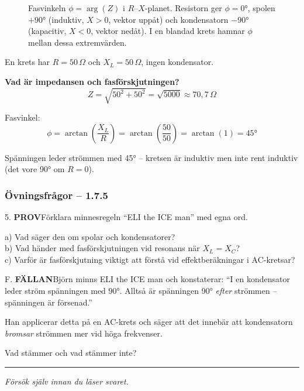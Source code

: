 \documentclass[a4paper,11pt,twoside]{book}
\newcommand{\qprov}{\colorbox{redpale}{\textcolor{reddark}{\headingfont\bfseries\tiny PROV}}}
\newcommand{\qfallan}{\colorbox{ljusbrun}{\textcolor{kakao}{\headingfont\bfseries\tiny FÄLLAN}}}
\begin{document}
\begin{figure}[htbp]
\begin{tikzpicture}[>=stealth, font=\small]
\end{tikzpicture}
\caption{Fasvinkeln $\phi = \arg(Z)$ i $R$--$X$-planet.
Resistorn ger $\phi=0°$, spolen $+90°$ (induktiv, $X>0$, vektor uppåt)
och kondensatorn $-90°$ (kapacitiv, $X<0$, vektor nedåt).
I en blandad krets hamnar $\phi$ mellan dessa extremvärden.}
\label{fig:fasordiagram}
\end{figure}

\begin{worked}[title={Räkneexempel 1.7.5 -- Fasförhållande i en blandad krets}]
En krets har $R = 50\,\Omega$ och $X_L = 50\,\Omega$,
ingen kondensator.

\textbf{Vad är impedansen och fasförskjutningen?}
\[ Z = \sqrt{50^2 + 50^2} = \sqrt{5000} \approx 70{,}7\,\Omega \]

Fasvinkel:
\[ \phi = \arctan\!\left(\frac{X_L}{R}\right) = \arctan\!\left(\frac{50}{50}\right) = \arctan(1) = 45° \]

Spänningen leder strömmen med 45° -- kretsen är
induktiv men inte rent induktiv (det vore 90° om
$R = 0$).
\end{worked}

\subsubsection*{Övningsfrågor -- 1.7.5}

\begin{qblock}{5.}
\qprov\quad Förklara minnesregeln ``ELI the ICE man''
med egna ord.

a) Vad säger den om spolar och kondensatorer?\\
b) Vad händer med fasförskjutningen vid resonans
när $X_L = X_C$?\\
c) Varför är fasförskjutning viktigt att förstå
vid effektberäkningar i AC-kretsar?
\end{qblock}

\begin{qblock}{F.}
\qfallan\quad Björn minns ELI the ICE man och
konstaterar: ``I en kondensator leder ström
spänningen med 90°. Alltså är spänningen 90°
\emph{efter} strömmen -- spänningen är försenad.''

Han applicerar detta på en AC-krets och säger att
det innebär att kondensatorn \emph{bromsar} strömmen
mer vid höga frekvenser.

Vad stämmer och vad stämmer inte?
\end{qblock}

\medskip
\noindent\rule{\textwidth}{0.4pt}
{\small\itshape Försök själv innan du läser svaret.}
\medskip
\end{document}
